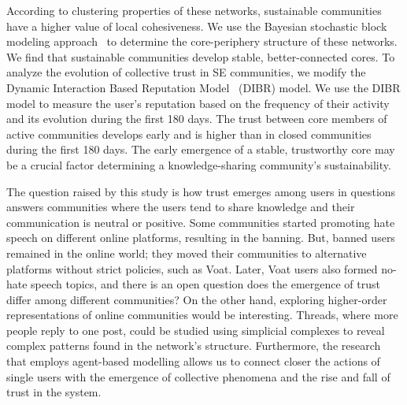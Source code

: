According to clustering properties of these networks, sustainable communities have a higher value of local cohesiveness. We use the Bayesian stochastic block modeling approach~\cite{gallagher2020clarified} to determine the core-periphery structure of these networks. We find that sustainable communities develop stable, better-connected cores. To analyze the evolution of collective trust in SE communities, we modify the Dynamic Interaction Based Reputation Model~\cite{melnikov2018toward} (DIBR) model. We use the DIBR model to measure the user's reputation based on the frequency of their activity and its evolution during the first 180 days. The trust between core members of active communities develops early and is higher than in closed communities during the first 180 days. The early emergence of a stable, trustworthy core may be a crucial factor determining a knowledge-sharing community's sustainability. 

The question raised by this study is how trust emerges among users in questions answers communities where the users tend to share knowledge and their communication is neutral or positive. Some communities started promoting hate speech on different online platforms, resulting in the banning. But, banned users remained in the online world; they moved their communities to alternative platforms without strict policies, such as Voat. Later, Voat users also formed no-hate speech topics, and there is an open question does the emergence of trust differ among different communities? On the other hand, exploring higher-order representations of online communities would be interesting. Threads, where more people reply to one post, could be studied using simplicial complexes to reveal complex patterns found in the network's structure. Furthermore, the research that employs agent-based modelling allows us to connect closer the actions of single users with the emergence of collective phenomena and the rise and fall of trust in the system. 


{}\selectfont


	

